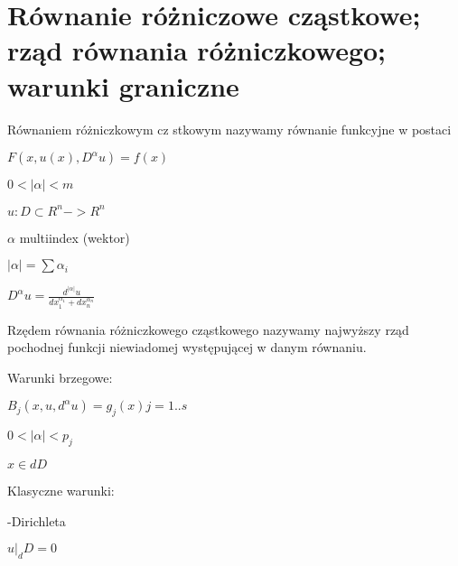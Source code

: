 \section{Równanie różniczowe cząstkowe; rząd równania różniczkowego; warunki graniczne}
Równaniem różniczkowym cz
stkowym nazywamy równanie funkcyjne w postaci

$F(x ,u(x) , D^\alpha u) = f(x)$

$0<|\alpha| < m$

$u:D \subset R^n -> R^n$

$\alpha$ multiindex (wektor)

$|\alpha| = \sum \alpha_i$

$D^\alpha u = \frac{d^{|\alpha|} u}{dx_1^{\alpha_1} + dx_n^{\alpha_n}}$


Rzędem równania różniczkowego cząstkowego nazywamy najwyższy rząd pochodnej funkcji niewiadomej występującej w danym równaniu. 

Warunki brzegowe:

$ B_j(x,u,d^\alpha u) = g_j(x) j=1 .. s $

$ 0 < |\alpha| < p_j$

$x \in dD$

Klasyczne warunki:

-Dirichleta

$ u|_dD =0$